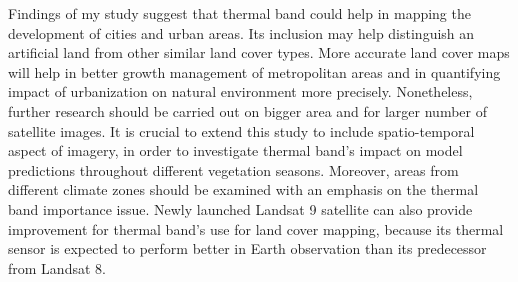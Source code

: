 \documentclass{amuthesis}
\begin{document}
Findings of my study suggest that thermal band could help in mapping the
development of cities and urban areas. Its inclusion may help
distinguish an artificial land from other similar land cover types. More
accurate land cover maps will help in better growth management of
metropolitan areas and in quantifying impact of urbanization on natural
environment more precisely. Nonetheless, further research should be
carried out on bigger area and for larger number of satellite images. It
is crucial to extend this study to include spatio-temporal aspect of
imagery, in order to investigate thermal band's impact on model
predictions throughout different vegetation seasons. Moreover, areas
from different climate zones should be examined with an emphasis on the
thermal band importance issue. Newly launched Landsat 9 satellite can
also provide improvement for thermal band's use for land cover mapping,
because its thermal sensor is expected to perform better in Earth
observation than its predecessor from Landsat 8.

\printbibliography[heading=bibintoc, title=Bibliography]
\end{document}
